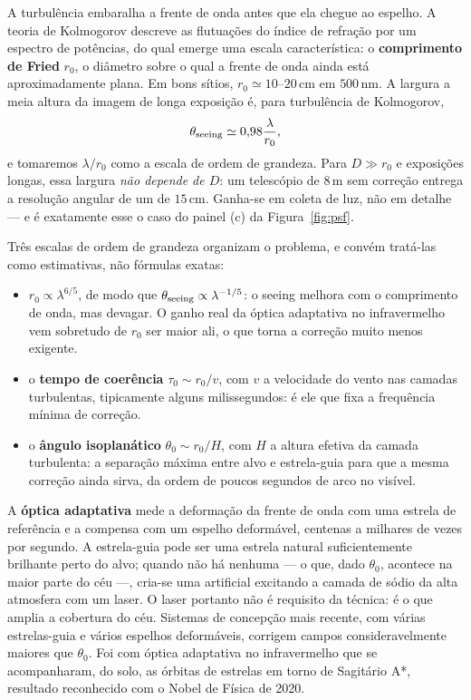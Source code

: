 \documentclass[11pt,a4paper]{article}
\begin{document}
A turbulência embaralha a frente de onda antes que ela chegue ao espelho. A teoria de Kolmogorov descreve as
flutuações do índice de refração por um espectro de potências, do qual emerge uma escala característica: o
\textbf{comprimento de Fried} $r_0$, o diâmetro sobre o qual a frente de onda ainda está aproximadamente plana.
Em bons sítios, $r_0\simeq10$--$20\,\mathrm{cm}$ em $500\,\mathrm{nm}$. A largura a meia altura da imagem de longa
exposição é, para turbulência de Kolmogorov,
\[
\theta_{\rm seeing}\simeq0{,}98\frac{\lambda}{r_0},
\]
e tomaremos $\lambda/r_0$ como a escala de ordem de grandeza. Para $D\gg r_0$ e exposições longas, essa largura
\emph{não depende de $D$}: um telescópio de $8\,\mathrm{m}$ sem correção entrega a resolução angular de um de
$15\,\mathrm{cm}$. Ganha-se em coleta de luz, não em detalhe --- e é exatamente esse o caso do painel (c) da
Figura~\ref{fig:psf}.

Três escalas de ordem de grandeza organizam o problema, e convém tratá-las como estimativas, não fórmulas
exatas:
\begin{itemize}
\item $r_0\propto\lambda^{6/5}$, de modo que $\theta_{\rm seeing}\propto\lambda^{-1/5}$: o seeing melhora com o
comprimento de onda, mas devagar. O ganho real da óptica adaptativa no infravermelho vem sobretudo de $r_0$ ser
maior ali, o que torna a correção muito menos exigente.
\item o \textbf{tempo de coerência} $\tau_0\sim r_0/v$, com $v$ a velocidade do vento nas camadas turbulentas,
tipicamente alguns milissegundos: é ele que fixa a frequência mínima de correção.
\item o \textbf{ângulo isoplanático} $\theta_0\sim r_0/H$, com $H$ a altura efetiva da camada turbulenta: a
separação máxima entre alvo e estrela-guia para que a mesma correção ainda sirva, da ordem de poucos segundos de
arco no visível.
\end{itemize}

A \textbf{óptica adaptativa} mede a deformação da frente de onda com uma estrela de referência e a compensa com um
espelho deformável, centenas a milhares de vezes por segundo. A estrela-guia pode ser uma estrela natural
suficientemente brilhante perto do alvo; quando não há nenhuma --- o que, dado $\theta_0$, acontece na maior parte
do céu ---, cria-se uma artificial excitando a camada de sódio da alta atmosfera com um laser. O laser portanto
não é requisito da técnica: é o que amplia a cobertura do céu. Sistemas de concepção mais recente, com várias
estrelas-guia e vários espelhos deformáveis, corrigem campos consideravelmente maiores que $\theta_0$. Foi com
óptica adaptativa no infravermelho que se acompanharam, do solo, as órbitas de estrelas em torno de Sagitário A*,
resultado reconhecido com o Nobel de Física de 2020.
\end{document}
